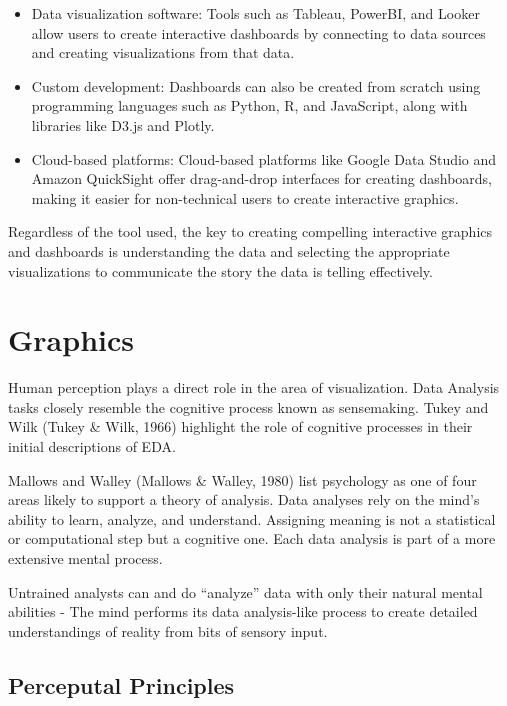\documentclass[print]{nuthesis}
\providecommand{\tightlist}{%
  \setlength{\itemsep}{0pt}\setlength{\parskip}{0pt}}
\begin{document}
\begin{itemize}
\tightlist
\item
  Data visualization software: Tools such as Tableau, PowerBI, and Looker allow users to create interactive dashboards by connecting to data sources and creating visualizations from that data.
\item
  Custom development: Dashboards can also be created from scratch using programming languages such as Python, R, and JavaScript, along with libraries like D3.js and Plotly.
\item
  Cloud-based platforms: Cloud-based platforms like Google Data Studio and Amazon QuickSight offer drag-and-drop interfaces for creating dashboards, making it easier for non-technical users to create interactive graphics.
\end{itemize}

Regardless of the tool used, the key to creating compelling interactive graphics and dashboards is understanding the data and selecting the appropriate visualizations to communicate the story the data is telling effectively.

\hypertarget{graphics}{%
\section{Graphics}\label{graphics}}

Human perception plays a direct role in the area of visualization. Data Analysis tasks closely resemble the cognitive process known as sensemaking. Tukey and Wilk (Tukey \& Wilk, 1966) highlight the role of cognitive processes in their initial descriptions of EDA.

Mallows and Walley (Mallows \& Walley, 1980) list psychology as one of four areas likely to support a theory of analysis. Data analyses rely on the mind's ability to learn, analyze, and understand. Assigning meaning is not a statistical or computational step but a cognitive one. Each data analysis is part of a more extensive mental process.

Untrained analysts can and do ``analyze'' data with only their natural mental abilities - The mind performs its data analysis-like process to create detailed understandings of reality from bits of sensory input.

\hypertarget{perceputal-principles}{%
\subsection{Perceputal Principles}\label{perceputal-principles}}
\end{document}
